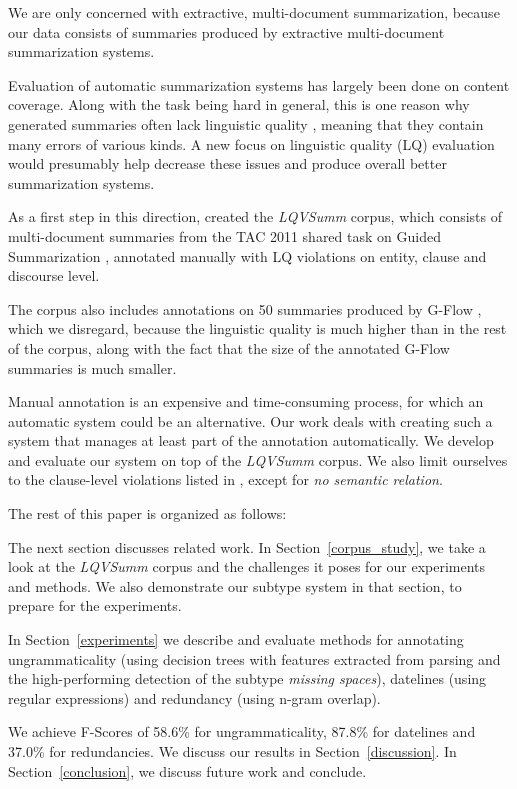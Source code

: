 \documentclass[a4paper,10pt]{scrartcl}
\theoremstyle{style}
\begin{document}
We are only concerned with extractive, multi-document summarization, because our data consists of summaries produced by extractive multi-document summarization systems.

Evaluation of automatic summarization systems has largely been done on content coverage. Along with the task being hard in general, this is one reason why generated summaries often lack linguistic quality \citep{nenkova2011foundations}, meaning that they contain many errors of various kinds. A new focus on linguistic quality (LQ) evaluation would presumably help decrease these issues and produce overall better summarization systems.

As a first step in this direction, \cite{friedrichlqvsumm} created the \textit{LQVSumm} corpus, which consists of multi-document summaries from the TAC 2011 shared task on Guided Summarization \citep{owczarzak2011overview}, annotated manually with LQ violations on entity, clause and discourse level.

The corpus also includes annotations on 50 summaries produced by G-Flow \citep{gflow}, which we disregard, because the linguistic quality is much higher than in the rest of the corpus, along with the fact that the size of the annotated G-Flow summaries is much smaller.

Manual annotation is an expensive and time-consuming process, for which an automatic system could be an alternative. Our work deals with creating such a system that manages at least part of the annotation automatically. We develop and evaluate our system on top of the \textit{LQVSumm} corpus. We also limit ourselves to the clause-level violations listed in \cite{friedrichlqvsumm}, except for \textit{no semantic relation}.

The rest of this paper is organized as follows:

The next section discusses related work. In Section~\ref{corpus_study}, we take a look at the \textit{LQVSumm} corpus and the challenges it poses for our experiments and methods. We also demonstrate our subtype system in that section, to prepare for the experiments.

In Section~\ref{experiments} we describe and evaluate methods for annotating ungrammaticality (using decision trees with features extracted from parsing and the high-performing detection of the subtype \textit{missing spaces}), datelines (using regular expressions) and redundancy (using n-gram overlap).

We achieve F-Scores of 58.6\% for ungrammaticality, 87.8\% for datelines and 37.0\% for redundancies. We discuss our results in Section~\ref{discussion}. In Section~\ref{conclusion}, we discuss future work and conclude.
\end{document}

